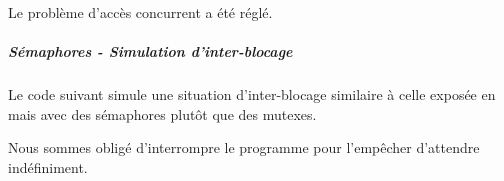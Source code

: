 \documentclass[a4paper, 12pt]{article}
\begin{document}



Le problème d'accès concurrent a été réglé.

\subparagraph{Sémaphores - Simulation d'inter-blocage\\}
Le code suivant simule une situation d'inter-blocage similaire à celle exposée en  mais avec des sémaphores plutôt que des mutexes.




Nous sommes obligé d'interrompre le programme pour l'empêcher d'attendre indéfiniment.
\end{document}
